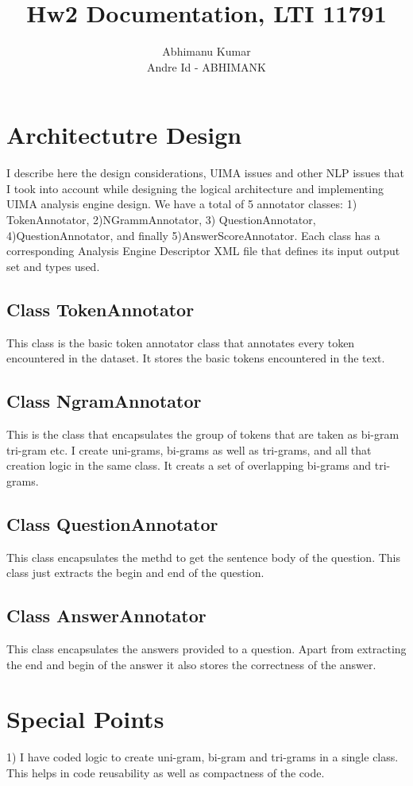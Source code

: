 \documentclass{article}
\title{Hw2 Documentation, LTI 11791}
\author{Abhimanu Kumar \\ Andre Id - ABHIMANK}
\date
\begin{document}
\maketitle

\section{Architectutre Design}
I describe here the design considerations, UIMA issues and other 
NLP issues that I took into account while designing the logical architecture 
and implementing UIMA analysis engine design.
We have a total of 5 annotator classes: 1) TokenAnnotator, 2)NGrammAnnotator,
3) QuestionAnnotator, 4)QuestionAnnotator, and finally 5)AnswerScoreAnnotator.
Each class has a corresponding Analysis Engine Descriptor XML file that
defines its input output set and types used.

\subsection{Class TokenAnnotator}
This class is the basic token annotator class that annotates every token 
encountered in the dataset. It stores the basic tokens encountered in the text. 

\subsection{Class NgramAnnotator}
This is the class that encapsulates the group of tokens that are taken as 
bi-gram tri-gram etc. I create uni-grams, bi-grams as well as tri-grams, and 
all that creation logic in the same class. It creats a set of overlapping
bi-grams and tri-grams.


\subsection{Class QuestionAnnotator}
This class encapsulates the methd to get the sentence body of the question. 
This class just extracts the begin and end of the question.
 
\subsection{Class AnswerAnnotator}
This class encapsulates the answers provided to a question. Apart from
extracting the end and begin of the answer it also stores the correctness of the
answer.

\section{Special Points}
1) I have coded logic to create uni-gram, bi-gram and tri-grams in a single
class. This helps in code reusability as well as compactness of the code.
\end{document}
